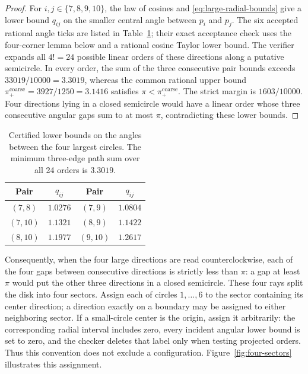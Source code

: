 \documentclass[11pt,a4paper]{article}
\theoremstyle{remark}
\begin{document}
\begin{proof}
For $i,j\in\{7,8,9,10\}$, the law of cosines and
\eqref{eq:large-radial-bounds} give a lower bound $q_{ij}$ on the smaller
central angle between $p_i$ and $p_j$.  The six accepted rational angle
ticks are listed in Table~\ref{tab:large-four-angles}; their exact
acceptance check uses the four-corner lemma below and a rational cosine
Taylor lower bound.  The verifier expands all $4!=24$ possible linear orders
of these directions along a putative semicircle.  In every order, the sum of
the three consecutive pair bounds exceeds
$33019/10000=3.3019$, whereas the common rational upper bound
$\pi_+^{\mathrm{coarse}}=3927/1250=3.1416$ satisfies
$\pi<\pi_+^{\mathrm{coarse}}$.  The strict margin is
$1603/10000$.  Four directions lying in a closed semicircle would have a
linear order whose three consecutive angular gaps sum to at most $\pi$,
contradicting these lower bounds.
\end{proof}

\begin{table}[ht]
\centering
\small
\caption{Certified lower bounds on the angles between the four largest
circles.  The minimum three-edge path sum over all 24 orders is $3.3019$.}
\label{tab:large-four-angles}
\begin{tabular}{cc|cc}
\toprule
Pair & $q_{ij}$ & Pair & $q_{ij}$\\
\midrule
$(7,8)$ & $1.0276$ & $(7,9)$ & $1.0804$\\
$(7,10)$ & $1.1321$ & $(8,9)$ & $1.1422$\\
$(8,10)$ & $1.1977$ & $(9,10)$ & $1.2617$\\
\bottomrule
\end{tabular}
\end{table}

Consequently, when the four large directions are read counterclockwise,
each of the four gaps between consecutive directions is strictly less than
$\pi$: a gap at least $\pi$ would put the other three directions in a
closed semicircle.  These four rays split the disk into four sectors.  Assign
each of circles $1,\ldots,6$ to the sector containing its center direction;
a direction exactly on a boundary may be assigned to either neighboring
sector.  If a small-circle center is the origin, assign it arbitrarily:
the corresponding radial interval includes zero, every incident angular
lower bound is set to zero, and the checker deletes that label only when
testing projected orders.  Thus this convention does not exclude a
configuration.  Figure~\ref{fig:four-sectors} illustrates this assignment.
\end{document}
